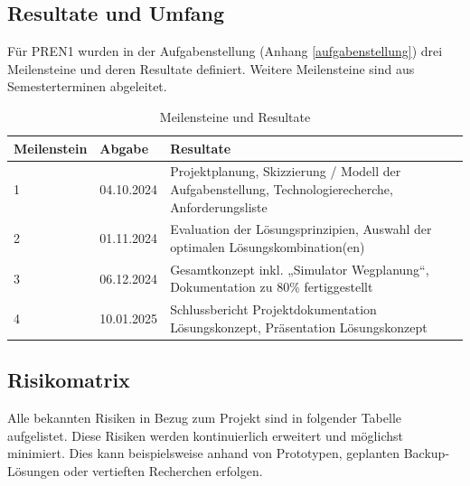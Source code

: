 \documentclass[../main.tex]{subfiles}
\begin{document}
\subsection{Resultate und Umfang}
Für PREN1 wurden in der Aufgabenstellung (Anhang \ref{aufgabenstellung}) drei Meilensteine und deren Resultate definiert. Weitere Meilensteine sind aus Semesterterminen abgeleitet.
\begin{table}[H]
\centering
\begin{tabular}{|l|l|p{10cm}|}
\hline
\textbf{Meilenstein} & \textbf{Abgabe} & \textbf{Resultate} \\ \hline
 1        & 04.10.2024      & Projektplanung, Skizzierung / Modell der Aufgabenstellung, Technologierecherche, Anforderungsliste \\ \hline
 2        & 01.11.2024      & Evaluation der Lösungsprinzipien, Auswahl der optimalen Lösungskombination(en) \\ \hline
 3        & 06.12.2024      & Gesamtkonzept inkl. „Simulator Wegplanung“, Dokumentation zu 80\% fertiggestellt \\ \hline
 4        & 10.01.2025      &  Schlussbericht Projektdokumentation Lösungskonzept, Präsentation Lösungskonzept\\ \hline 
 
\end{tabular}
\caption{Meilensteine und Resultate}
\label{tab:meilensteine}
\end{table}


\subsection{Risikomatrix} \label{risikomatrix}

Alle bekannten Risiken in Bezug zum Projekt sind in folgender Tabelle aufgelistet. Diese Risiken werden kontinuierlich erweitert und möglichst minimiert. Dies kann beispielsweise anhand von Prototypen, geplanten Backup-Lösungen oder vertieften Recherchen erfolgen.
\end{document}
